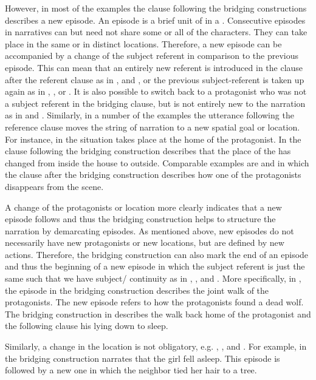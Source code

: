 \documentclass[output=paper]{LSP/langsci}
\begin{document}
However, in most of the examples the clause following the bridging constructions describes a new episode. An episode is a brief unit of  in a . Consecutive episodes in narratives can but need not share some or all of the characters. They can take place in the same or in distinct locations. Therefore, a new episode can be accompanied by a change of the subject referent in comparison to the previous episode. This can mean that an entirely new referent is introduced in the clause after the referent clause as in ,  and , or the previous subject-referent is taken up again as in , , or . It is also possible to switch back to a protagonist who was not a subject referent in the bridging clause, but is not entirely new to the narration as in  and .
Similarly, in a number of the examples the utterance following the reference clause moves the string of narration to a new spatial goal or location. For instance, in  the situation takes place at the home of the protagonist. In  the clause following the bridging construction describes that the place of the  has changed from inside the house to outside. Comparable examples are  and  in which the clause after the bridging construction describes how one of the protagonists disappears from the scene.

A change of the protagonists or location more clearly indicates that a new episode follows and thus the bridging construction helps to structure the narration by demarcating episodes. As mentioned above, new episodes do not necessarily have new protagonists or new locations, but are defined by new actions. Therefore, the bridging construction can also mark the end of an episode and thus the beginning of a new episode in which the subject referent is just the same such that we have subject/ continuity as in , , and . More specifically, in , the episode in the bridging construction describes the joint walk of the protagonists. The new episode refers to how the protagonists found a dead wolf. The bridging construction in  describes the walk back home of the protagonist and the following clause his lying down to sleep.

Similarly, a change in the location is not obligatory, e.g. , , and . For example, in  the bridging construction narrates that the girl fell asleep. This episode is followed by a new one in which the neighbor tied her hair to a tree.
\end{document}
